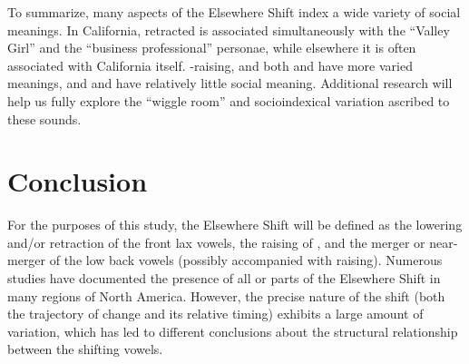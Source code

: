 
To summarize, many aspects of the Elsewhere Shift index a wide variety of social meanings. In California, retracted \bat is associated simultaneously with the ``Valley Girl'' and the ``business professional'' personae, while elsewhere it is often associated with California itself. \ban-raising, and both \lot and \thought have more varied meanings, and \bet and \bit have relatively little social meaning. Additional research will help us fully explore the ``wiggle room'' and socioindexical variation ascribed to these sounds.

\section{Conclusion}

For the purposes of this study, the Elsewhere Shift will be defined as the lowering and/or retraction of the front lax vowels, the raising of \ban, and the merger or near-merger of the low back vowels (possibly accompanied with raising). Numerous studies have documented the presence of all or parts of the Elsewhere Shift in many regions of North America. However, the precise nature of the shift (both the trajectory of change and its relative timing) exhibits a large amount of variation, which has led to different conclusions about the structural relationship between the shifting vowels.

